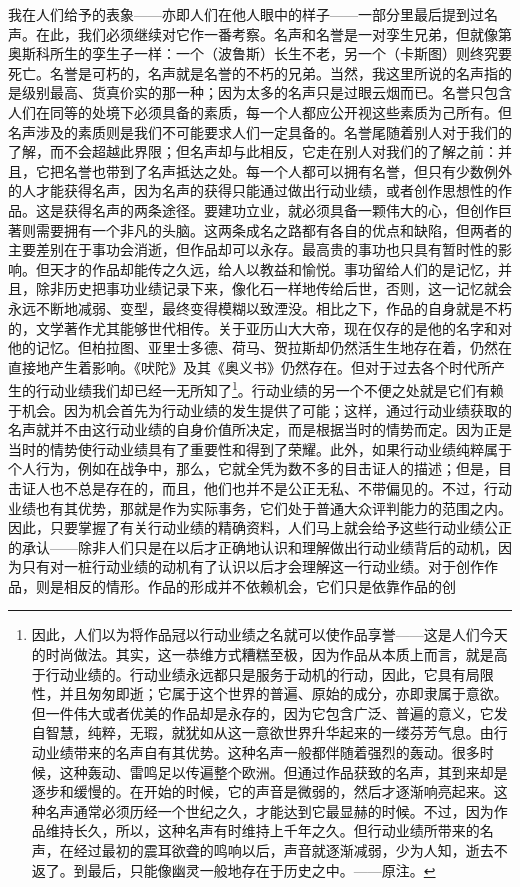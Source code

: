 \documentclass[12pt,oneside]{book}
\begin{document}
我在人们给予的表象——亦即人们在他人眼中的样子——一部分里最后提到过名声。在此，我们必须继续对它作一番考察。名声和名誉是一对孪生兄弟，但就像第奥斯科所生的孪生子一样：一个（波鲁斯）长生不老，另一个（卡斯图）则终究要死亡。名誉是可朽的，名声就是名誉的不朽的兄弟。当然，我这里所说的名声指的是级别最高、货真价实的那一种；因为太多的名声只是过眼云烟而已。名誉只包含人们在同等的处境下必须具备的素质，每一个人都应公开视这些素质为己所有。但名声涉及的素质则是我们不可能要求人们一定具备的。名誉尾随着别人对于我们的了解，而不会超越此界限；但名声却与此相反，它走在别人对我们的了解之前：并且，它把名誉也带到了名声抵达之处。每一个人都可以拥有名誉，但只有少数例外的人才能获得名声，因为名声的获得只能通过做出行动业绩，或者创作思想性的作品。这是获得名声的两条途径。要建功立业，就必须具备一颗伟大的心，但创作巨著则需要拥有一个非凡的头脑。这两条成名之路都有各自的优点和缺陷，但两者的主要差别在于事功会消逝，但作品却可以永存。最高贵的事功也只具有暂时性的影响。但天才的作品却能传之久远，给人以教益和愉悦。事功留给人们的是记忆，并且，除非历史把事功业绩记录下来，像化石一样地传给后世，否则，这一记忆就会永远不断地减弱、变型，最终变得模糊以致湮没。相比之下，作品的自身就是不朽的，文学著作尤其能够世代相传。关于亚历山大大帝，现在仅存的是他的名字和对他的记忆。但柏拉图、亚里士多德、荷马、贺拉斯却仍然活生生地存在着，仍然在直接地产生着影响。《吠陀》及其《奥义书》仍然存在。但对于过去各个时代所产生的行动业绩我们却已经一无所知了\footnote{因此，人们以为将作品冠以行动业绩之名就可以使作品享誉——这是人们今天的时尚做法。其实，这一恭维方式糟糕至极，因为作品从本质上而言，就是高于行动业绩的。行动业绩永远都只是服务于动机的行动，因此，它具有局限性，并且匆匆即逝；它属于这个世界的普遍、原始的成分，亦即隶属于意欲。但一件伟大或者优美的作品却是永存的，因为它包含广泛、普遍的意义，它发自智慧，纯粹，无瑕，就犹如从这一意欲世界升华起来的一缕芬芳气息。由行动业绩带来的名声自有其优势。这种名声一般都伴随着强烈的轰动。很多时候，这种轰动、雷鸣足以传遍整个欧洲。但通过作品获致的名声，其到来却是逐步和缓慢的。在开始的时候，它的声音是微弱的，然后才逐渐响亮起来。这种名声通常必须历经一个世纪之久，才能达到它最显赫的时候。不过，因为作品维持长久，所以，这种名声有时维持上千年之久。但行动业绩所带来的名声，在经过最初的震耳欲聋的鸣响以后，声音就逐渐减弱，少为人知，逝去不返了。到最后，只能像幽灵一般地存在于历史之中。——原注。}。行动业绩的另一个不便之处就是它们有赖于机会。因为机会首先为行动业绩的发生提供了可能；这样，通过行动业绩获取的名声就并不由这行动业绩的自身价值所决定，而是根据当时的情势而定。因为正是当时的情势使行动业绩具有了重要性和得到了荣耀。此外，如果行动业绩纯粹属于个人行为，例如在战争中，那么，它就全凭为数不多的目击证人的描述；但是，目击证人也不总是存在的，而且，他们也并不是公正无私、不带偏见的。不过，行动业绩也有其优势，那就是作为实际事务，它们处于普通大众评判能力的范围之内。因此，只要掌握了有关行动业绩的精确资料，人们马上就会给予这些行动业绩公正的承认——除非人们只是在以后才正确地认识和理解做出行动业绩背后的动机，因为只有对一桩行动业绩的动机有了认识以后才会理解这一行动业绩。对于创作作品，则是相反的情形。作品的形成并不依赖机会，它们只是依靠作品的创
\end{document}
